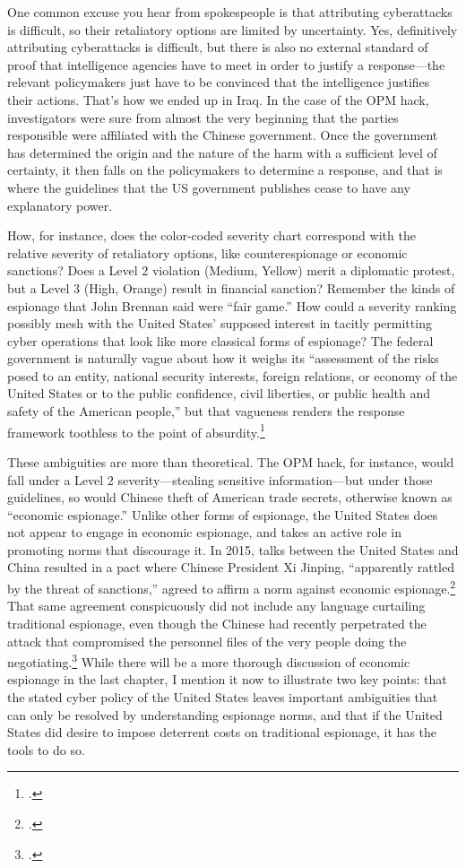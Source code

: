 \documentclass{memoir}
\begin{document}
\begin{refsegment}
One common excuse you hear from spokespeople is that attributing cyberattacks is difficult, so their retaliatory options are limited by uncertainty. Yes, definitively attributing cyberattacks is difficult, but there is also no external standard of proof that intelligence agencies have to meet in order to justify a response---the relevant policymakers just have to be convinced that the intelligence justifies their actions. That's how we ended up in Iraq. In the case of the OPM hack, investigators were sure from almost the very beginning that the parties responsible were affiliated with the Chinese government. Once the government has determined the origin and the nature of the harm with a sufficient level of certainty, it then falls on the policymakers to determine a response, and that is where the guidelines that the US government publishes cease to have any explanatory power.

How, for instance, does the color-coded severity chart correspond with the relative severity of retaliatory options, like counterespionage or economic sanctions? Does a Level 2 violation (Medium, Yellow) merit a diplomatic protest, but a Level 3 (High, Orange) result in financial sanction? Remember the kinds of espionage that John Brennan said were ``fair game.'' How could a severity ranking possibly mesh with the United States' supposed interest in tacitly permitting cyber operations that look like more classical forms of espionage? The federal government is naturally vague about how it weighs its ``assessment of the risks posed to an entity, national security interests, foreign relations, or economy of the United States or to the public confidence, civil liberties, or public health and safety of the American people,'' but that vagueness renders the response framework toothless to the point of absurdity.\footcite{office_of_the_press_secretary_fact_2016}

These ambiguities are more than theoretical. The OPM hack, for instance, would fall under a Level 2 severity---stealing sensitive information---but under those guidelines, so would Chinese theft of American trade secrets, otherwise known as ``economic espionage.'' Unlike other forms of espionage, the United States does not appear to engage in economic espionage, and takes an active role in promoting norms that discourage it. In 2015, talks between the United States and China resulted in a pact where Chinese President Xi Jinping, ``apparently rattled by the threat of sanctions,'' agreed to affirm a norm against economic espionage.\footcite{nakashima_u.s._2015} That same agreement conspicuously did not include any language curtailing traditional espionage, even though the Chinese had recently perpetrated the attack that compromised the personnel files of the very people doing the negotiating.\footcite{nakashima_u.s._2015} While there will be a more thorough discussion of economic espionage in the last chapter, I mention it now to illustrate two key points: that the stated cyber policy of the United States leaves important ambiguities that can only be resolved by understanding espionage norms, and that if the United States did desire to impose deterrent costs on traditional espionage, it has the tools to do so.


\end{refsegment}
\end{document}
